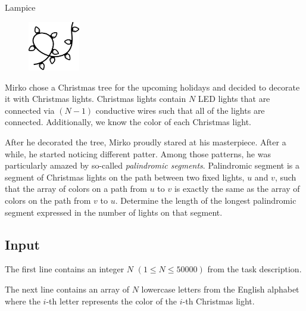 \begin{statement}[
  problempoints=110,
  timelimit=1 second,
  memorylimit=512 MiB,
]{Lampice}

\setlength\intextsep{-0.1cm}
\begin{figure}
\centering
\includegraphics[width=0.2\textwidth]{img/lampice.png}
\end{figure}

Mirko chose a Christmas tree for the upcoming holidays and decided to decorate
it with Christmas lights. Christmas lights contain $N$ LED lights that are
connected via $(N-1)$ conductive wires such that all of the lights are connected.
Additionally, we know the color of each Christmas light.

After he decorated the tree, Mirko proudly stared at his masterpiece. After a
while, he started noticing different patter. Among those patterns, he was
particularly amazed by so-called \textit{palindromic segments}. Palindromic
segment is a segment of Christmas lights on the path between two fixed lights,
$u$ and $v$, such that the array of colors on a path from $u$ to $v$ is exactly
the same as the array of colors on the path from $v$ to $u$.
Determine the length of the longest palindromic segment
expressed in the number of lights on that segment.


\subsection*{Input}
The first line contains an integer $N$ $(1 \le N \le 50 000)$ from the task
description.

The next line contains an array of $N$ lowercase letters from the English
alphabet where the $i$-th letter represents the color of the $i$-th Christmas
light.


\end{statement}
